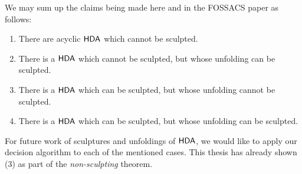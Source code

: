     We may sum up the claims being made here and in the FOSSACS paper as follows:
    
    \begin{enumerate}
        \item There are acyclic $\text{\textup{\textsf{HDA}}}$ which cannot be sculpted.
        \item There is a $\text{\textup{\textsf{HDA}}}$ which cannot be sculpted, but whose unfolding can be sculpted.
        \item There is a $\text{\textup{\textsf{HDA}}}$ which can be sculpted, but whose unfolding cannot be sculpted.
        \item There is a $\text{\textup{\textsf{HDA}}}$ which can be sculpted, but whose unfolding can be sculpted.        
    \end{enumerate}
    
    For future work of sculptures and unfoldings of $\text{\textup{\textsf{HDA}}}$, we would like to apply our decision algorithm to each of the mentioned cases. This thesis has already shown (3) as part of the \emph{non-sculpting} theorem.

    